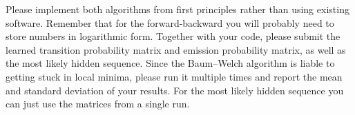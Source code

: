Please implement both algorithms from first principles rather than using existing software. Remember that for the forward-backward you will probably need to store numbers in logarithmic form. Together with your code, please submit the learned transition probability matrix and emission probability matrix, as well as the most likely hidden sequence. Since the Baum–Welch algorithm is liable to getting stuck in local minima, please run it multiple times and report the mean and standard deviation of your results. For the most likely hidden sequence you can just use the matrices from a single run.

